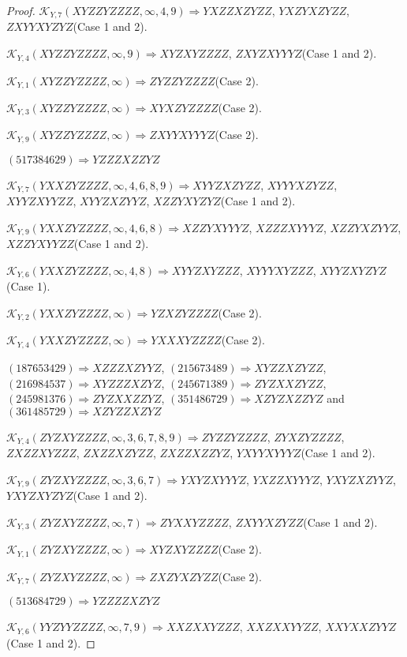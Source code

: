 \documentclass[12pt]{article}
\theoremstyle{plain}
\theoremstyle{definition}
\theoremstyle{remark}
\newcommand{\fancy}[1]{\mathcal{#1}}
\def\K{\fancy{K}}
\begin{document}
\begin{proof}
	$\K_{Y,7}(XYZZYZZZZ,\infty,4, 9)\Rightarrow $$YXZZXZYZZ$, $YXZYXZYZZ$, $ZXYYXYZYZ$(Case 1 and 2).
	
	$\K_{Y,4}(XYZZYZZZZ,\infty,9)\Rightarrow $$XYZXYZZZZ$, $ZXYZXYYYZ$(Case 1 and 2).
	
	$\K_{Y,1}(XYZZYZZZZ,\infty)\Rightarrow $$ZYZZYZZZZ$(Case 2).
	
	$\K_{Y,3}(XYZZYZZZZ,\infty)\Rightarrow $$XYXZYZZZZ$(Case 2).
	
	$\K_{Y,9}(XYZZYZZZZ,\infty)\Rightarrow $$ZXYYXYYYZ$(Case 2).
	
	
	
	$(5 1 7 3 8 4 6 2 9)\Rightarrow YZZZXZZYZ$
	
	
	$\K_{Y,7}(YXXZYZZZZ,\infty,4, 6, 8, 9)\Rightarrow $$XYYZXZYZZ$, $XYYYXZYZZ$, $XYYZXYYZZ$, $XYYZXZYYZ$, $XZZYXYZYZ$(Case 1 and 2).
	
	$\K_{Y,9}(YXXZYZZZZ,\infty,4, 6, 8)\Rightarrow $$XZZYXYYYZ$, $XZZZXYYYZ$, $XZZYXZYYZ$, $XZZYXYYZZ$(Case 1 and 2).
	
	$\K_{Y,6}(YXXZYZZZZ,\infty,4, 8)\Rightarrow $$XYYZXYZZZ$, $XYYYXYZZZ$, $XYYZXYZYZ$(Case 1).
	
	$\K_{Y,2}(YXXZYZZZZ,\infty)\Rightarrow $$YZXZYZZZZ$(Case 2).
	
	$\K_{Y,4}(YXXZYZZZZ,\infty)\Rightarrow $$YXXXYZZZZ$(Case 2).
	
	
	
	$(1 8 7 6 5 3 4 2 9)\Rightarrow XZZZXZYYZ$, $(2 1 5 6 7 3 4 8 9)\Rightarrow XYZZXZYZZ$, $(2 1 6 9 8 4 5 3 7)\Rightarrow XYZZZXZYZ$, $(2 4 5 6 7 1 3 8 9)\Rightarrow ZYZXXZYZZ$, $(2 4 5 9 8 1 3 7 6)\Rightarrow ZYZXXZZYZ$, $(3 5 1 4 8 6 7 2 9)\Rightarrow XZYZXZZYZ$ and $(3 6 1 4 8 5 7 2 9)\Rightarrow XZYZZXZYZ$
	
	
	$\K_{Y,4}(ZYZXYZZZZ,\infty,3, 6, 7, 8, 9)\Rightarrow $$ZYZZYZZZZ$, $ZYXZYZZZZ$, $ZXZZXYZZZ$, $ZXZZXZYZZ$, $ZXZZXZZYZ$, $YXYYXYYYZ$(Case 1 and 2).
	
	$\K_{Y,9}(ZYZXYZZZZ,\infty,3, 6, 7)\Rightarrow $$YXYZXYYYZ$, $YXZZXYYYZ$, $YXYZXZYYZ$, $YXYZXYZYZ$(Case 1 and 2).
	
	$\K_{Y,3}(ZYZXYZZZZ,\infty,7)\Rightarrow $$ZYXXYZZZZ$, $ZXYYXZYZZ$(Case 1 and 2).
	
	$\K_{Y,1}(ZYZXYZZZZ,\infty)\Rightarrow $$XYZXYZZZZ$(Case 2).
	
	$\K_{Y,7}(ZYZXYZZZZ,\infty)\Rightarrow $$ZXZYXZYZZ$(Case 2).
	
	
	
	$(5 1 3 6 8 4 7 2 9)\Rightarrow YZZZZXZYZ$
	
	
	$\K_{Y,6}(YYZYYZZZZ,\infty,7, 9)\Rightarrow $$XXZXXYZZZ$, $XXZXXYYZZ$, $XXYXXZYYZ$(Case 1 and 2).
	

\end{proof}
\end{document}
